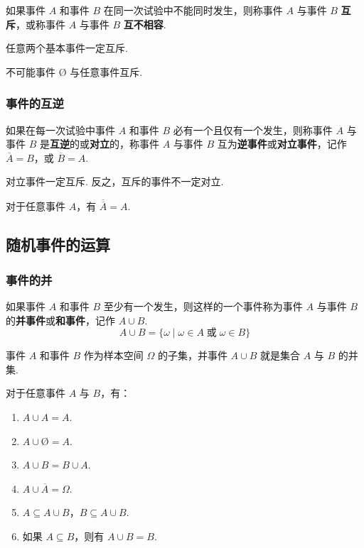 如果事件 $A$ 和事件 $B$ 在同一次试验中不能同时发生，则称事件 $A$ 与事件 $B$ \textbf{互斥}，或称事件 $A$ 与事件 $B$ \textbf{互不相容}.

任意两个基本事件一定互斥.

不可能事件 $\text{\O}$ 与任意事件互斥.

\subsubsection{事件的互逆}

如果在每一次试验中事件 $A$ 和事件 $B$ 必有一个且仅有一个发生，则称事件 $A$ 与事件 $B$ 是\textbf{互逆}的或\textbf{对立}的，称事件 $A$ 与事件 $B$ 互为\textbf{逆事件}或\textbf{对立事件}，记作 $\overline{A}=B$，或 $\overline{B}=A$.

对立事件一定互斥. 反之，互斥的事件不一定对立.

对于任意事件 $A$，有 $\overline{\overline{A}}=A$.

\subsection{随机事件的运算}

\subsubsection{事件的并}

如果事件 $A$ 和事件 $B$ 至少有一个发生，则这样的一个事件称为事件 $A$ 与事件 $B$ 的\textbf{并事件}或\textbf{和事件}，记作 $A \cup B$.
$$
A \cup B = \{ \omega \mid \omega \in A \;\text{或}\; \omega \in B \}
$$

事件 $A$ 和事件 $B$ 作为样本空间 $\varOmega$ 的子集，并事件 $A \cup B$ 就是集合 $A$ 与 $B$ 的并集.

\begin{property}
    \indent 对于任意事件 $A$ 与 $B$，有：
    \begin{enumerate}
        \item $A \cup A = A$.
        \item $A \cup \text{\O} = A$.
        \item $A \cup B = B \cup A$.
        \item $A \cup \overline{A} = \varOmega$.
        \item $A \subseteq A \cup B$，$B \subseteq A \cup B$.
        \item 如果 $A \subseteq B$，则有 $A \cup B=B$.
    \end{enumerate}
\end{property}

